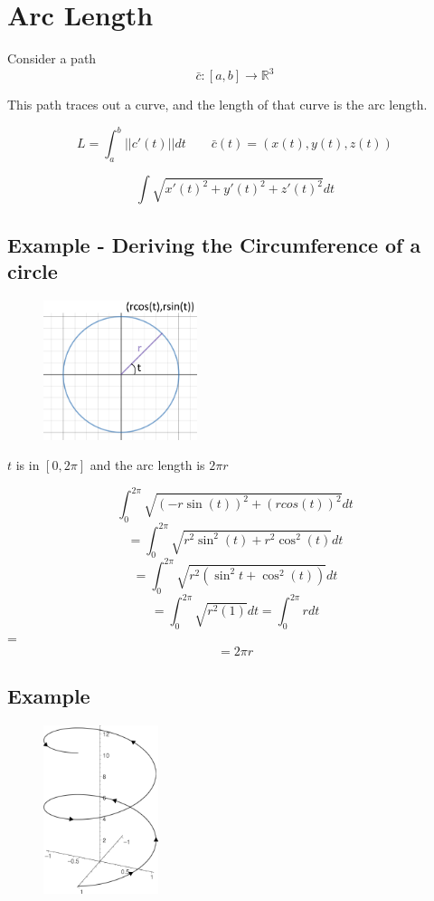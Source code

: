 \documentclass{article}
\begin{document}
\section{Arc Length}
Consider a path 
\[\bar{c}: [a,b]\rightarrow\mathbb{R}^3\]

This path traces out a curve, and the length of that curve is the arc length.

\[L=\int^{b}_{a} ||c\prime(t)|| dt \qquad \bar{c}(t)=(x(t),y(t),z(t))\]

\[\int \sqrt{x\prime(t)^2+y\prime(t)^2+z\prime(t)^2}dt\]

\subsection*{Example - Deriving the Circumference of a circle}

\begin{figure}
    \begin{center}
      \includegraphics[width=0.40\textwidth]{unitCircle.png}
    \end{center}
\end{figure}
$t$ is in $[0,2\pi]$ and the arc length is $2\pi r$

\[\int_{0}^{2\pi} \sqrt{(-r\sin(t))^2+(rcos(t))^2}dt\]
\[=\int_{0}^{2\pi} \sqrt{r^{2}\sin^2(t)+r^2\cos^{2}(t)}dt\]
\[=\int_{0}^{2\pi} \sqrt{r^{2}(\sin^{2}t+\cos^2(t))}dt\]
\[=\int_{0}^{2\pi} \sqrt{r^{2}(1)}dt = \int_{0}^{2\pi} rdt\]
=\[=2\pi r\]
\newpage
\subsection*{Example}


\begin{figure}
    \begin{center}
      \includegraphics[width=0.30\textwidth]{Helix.png}
    \end{center}
\end{figure}
\end{document}
